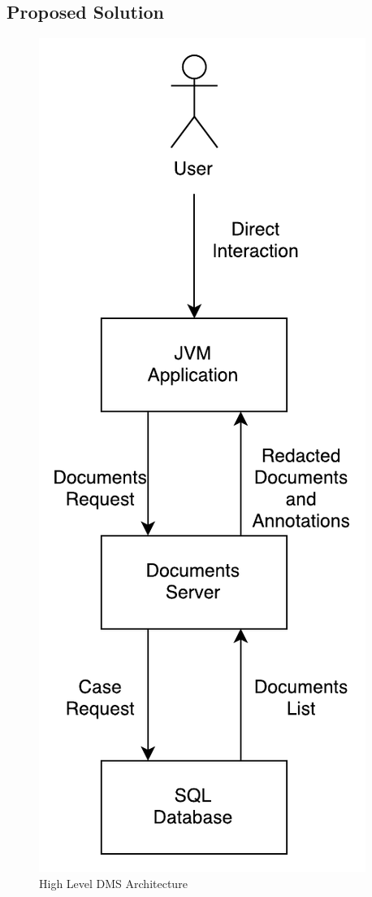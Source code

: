 \subsection{Proposed Solution}
\begin{figure}[h]
	\begin{center}
		\includegraphics[scale=0.4]{images/DocumentManagementSystem.pdf}
	\end{center}
	\caption{High Level DMS Architecture}
	\label{fig:dmsArch}
\end{figure}

